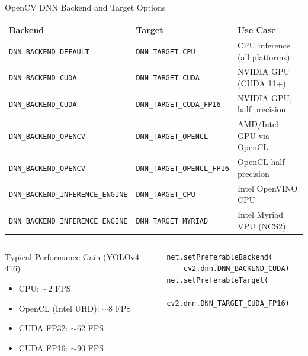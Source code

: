 \documentclass[aspectratio=169]{beamer}
\begin{document}
\begin{frame}{OpenCV DNN Backend and Target Options}
  \begin{center}
  \small
  \begin{tabular}{lll}
    \toprule
    \textbf{Backend} & \textbf{Target} & \textbf{Use Case}\\
    \midrule
    \texttt{DNN\_BACKEND\_DEFAULT}   & \texttt{DNN\_TARGET\_CPU}        & CPU inference (all platforms)\\
    \texttt{DNN\_BACKEND\_CUDA}      & \texttt{DNN\_TARGET\_CUDA}       & NVIDIA GPU (CUDA 11+)\\
    \texttt{DNN\_BACKEND\_CUDA}      & \texttt{DNN\_TARGET\_CUDA\_FP16} & NVIDIA GPU, half precision\\
    \texttt{DNN\_BACKEND\_OPENCV}    & \texttt{DNN\_TARGET\_OPENCL}     & AMD/Intel GPU via OpenCL\\
    \texttt{DNN\_BACKEND\_OPENCV}    & \texttt{DNN\_TARGET\_OPENCL\_FP16}& OpenCL half precision\\
    \texttt{DNN\_BACKEND\_INFERENCE\_ENGINE} & \texttt{DNN\_TARGET\_CPU} & Intel OpenVINO CPU\\
    \texttt{DNN\_BACKEND\_INFERENCE\_ENGINE} & \texttt{DNN\_TARGET\_MYRIAD}& Intel Myriad VPU (NCS2)\\
    \bottomrule
  \end{tabular}
  \end{center}
  \begin{columns}
    \begin{block}{Typical Performance Gain (YOLOv4-416)}
      \begin{itemize}
        \item CPU: $\sim$2 FPS
        \item OpenCL (Intel UHD): $\sim$8 FPS
        \item CUDA FP32: $\sim$62 FPS
        \item CUDA FP16: $\sim$90 FPS
      \end{itemize}
    \end{block}
    \begin{lstlisting}[basicstyle=\ttfamily\scriptsize]
net.setPreferableBackend(
    cv2.dnn.DNN_BACKEND_CUDA)
net.setPreferableTarget(
    cv2.dnn.DNN_TARGET_CUDA_FP16)
    \end{lstlisting}
  \end{columns}
\end{frame}
\end{document}
